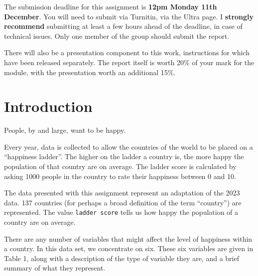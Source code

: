 \documentclass[11pt,a4paper]{article}
\begin{document}
%


\setcounter{section}{0}



The submission deadline for this assignment is \textbf{12pm Monday 11th December}. You will need to submit via Turnitin, via the Ultra page. I \textbf{strongly recommend} submitting at least a few hours ahead of the deadline, in case of technical issues. Only one member of the group should submit the report.
 
There will also be a presentation component to this work, instructions for which have been released separately. The report itself is worth 20\% of your mark for the module, with the presentation worth an additional 15\%.

\section{Introduction}

People, by and large, want to be happy.

Every year, data is collected to allow the countries of the world to be placed on a ``happiness ladder''. The higher on the ladder a country is, the more happy the population of that country are on average. The ladder score is calculated by asking 1000 people in the country to rate their happiness between 0 and 10.

The data presented with this assignment represent an adaptation of the 2023 data. 137 countries (for perhaps a broad definition of the term ``country'') are represented. The value \texttt{ladder score} tells us how happy the population of a country are on average.

There are any number of variables that might affect the level of happiness within a country. In this data set, we concentrate on six. These six variables are given in Table 1, along with a description of the type of variable they are, and a brief summary of what they represent. 
\end{document}
